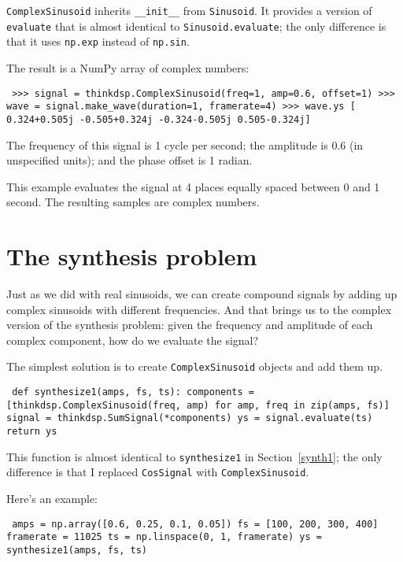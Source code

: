 \documentclass[12pt]{book} \usepackage[width=5.5in,height=8.5in, hmarginratio=3:2,vmarginratio=1:1]{geometry}
\begin{document}
{\tt ComplexSinusoid} inherits \verb"__init__" from {\tt Sinusoid}. It provides a version of {\tt evaluate} that is almost identical to {\tt Sinusoid.evaluate}; the only difference is that it uses {\tt np.exp} instead of {\tt np.sin}. 

The result is a NumPy array of complex numbers: 

\begin{verbatim} >>> signal = thinkdsp.ComplexSinusoid(freq=1, amp=0.6, offset=1) >>> wave = signal.make_wave(duration=1, framerate=4) >>> wave.ys [ 0.324+0.505j -0.505+0.324j -0.324-0.505j 0.505-0.324j] \end{verbatim} 

The frequency of this signal is 1 cycle per second; the amplitude is 0.6 (in unspecified units); and the phase offset is 1 radian. 

This example evaluates the signal at 4 places equally spaced between 0 and 1 second. The resulting samples are complex numbers. 

\section{The synthesis problem} 

Just as we did with real sinusoids, we can create compound signals by adding up complex sinusoids with different frequencies. And that brings us to the complex version of the synthesis problem: given the frequency and amplitude of each complex component, how do we evaluate the signal? 

The simplest solution is to create {\tt ComplexSinusoid} objects and add them up. 

\begin{verbatim} def synthesize1(amps, fs, ts): components = [thinkdsp.ComplexSinusoid(freq, amp) for amp, freq in zip(amps, fs)] signal = thinkdsp.SumSignal(*components) ys = signal.evaluate(ts) return ys \end{verbatim} 

This function is almost identical to {\tt synthesize1} in Section~\ref{synth1}; the only difference is that I replaced {\tt CosSignal} with {\tt ComplexSinusoid}. 

Here's an example: 

\begin{verbatim} amps = np.array([0.6, 0.25, 0.1, 0.05]) fs = [100, 200, 300, 400] framerate = 11025 ts = np.linspace(0, 1, framerate) ys = synthesize1(amps, fs, ts) \end{verbatim} 
\end{document}
